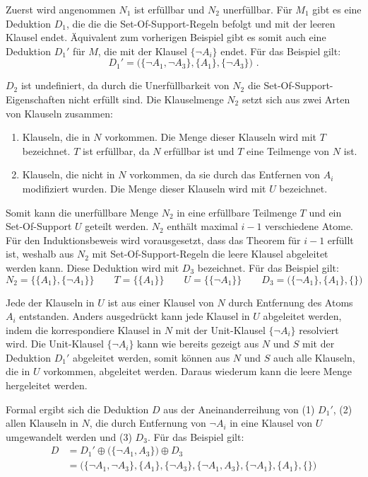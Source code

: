 Zuerst wird angenommen $N_1$ ist erfüllbar und $N_2$ unerfüllbar. Für $M_1$ gibt es eine Deduktion $D_1$, die die die Set-Of-Support-Regeln befolgt und mit der leeren Klausel endet. Äquivalent zum vorherigen Beispiel gibt es somit auch eine Deduktion $D_1'$ für $M$, die mit der Klausel $\{\neg A_i\}$ endet. Für das Beispiel gilt:
 $$D_1'=\big(\{\neg A_1, \neg A_3\},\{A_1\}, \{\neg A_3\}\big) \text{ .}$$
 
 $D_2$ ist undefiniert, da durch die Unerfüllbarkeit von $N_2$ die Set-Of-Support-Eigenschaften nicht erfüllt sind. Die Klauselmenge $N_2$ setzt sich aus zwei Arten von Klauseln zusammen:
 \begin{enumerate}
 	\item Klauseln, die in $N$ vorkommen. Die Menge dieser Klauseln wird mit $T$ bezeichnet. $T$ ist erfüllbar, da $N$ erfüllbar ist und $T$ eine Teilmenge von $N$ ist.
 	\item Klauseln, die nicht in $N$ vorkommen, da sie durch das Entfernen von $A_i$ modifiziert wurden. Die Menge dieser Klauseln wird mit $U$ bezeichnet.
 \end{enumerate}
 Somit kann die unerfüllbare Menge $N_2$ in eine erfüllbare Teilmenge $T$ und ein Set-Of-Support $U$ geteilt werden. $N_2$ enthält maximal $i-1$ verschiedene Atome. Für den Induktionsbeweis wird vorausgesetzt, dass das Theorem für $i-1$ erfüllt ist, weshalb aus $N_2$ mit Set-Of-Support-Regeln die leere Klausel abgeleitet werden kann. Diese Deduktion wird mit $D_3$ bezeichnet. Für das Beispiel gilt:
 $$N_2=\big\{\{A_1\},\{\neg A_1\}\big\} \quad\quad T=\big\{\{A_1\}\big\} \quad\quad U=\big\{\{\neg A_1\}\big\} \quad\quad D_3=\big(\{\neg A_1\},\{A_1\},\{\}\big)$$
 
 Jede der Klauseln in $U$ ist aus einer Klausel von $N$ durch Entfernung des Atoms $A_i$ entstanden. Anders ausgedrückt kann jede Klausel in $U$ abgeleitet werden, indem die korrespondiere Klausel in $N$ mit der Unit-Klausel $\{\neg A_i\}$ resolviert wird. Die Unit-Klausel $\{\neg A_i\}$ kann wie bereits gezeigt aus $N$ und $S$ mit der Deduktion $D_1'$ abgeleitet werden, somit können aus $N$ und $S$ auch alle Klauseln, die in $U$ vorkommen, abgeleitet werden. Daraus wiederum kann die leere Menge hergeleitet werden.
 
 Formal ergibt sich die Deduktion $D$ aus der Aneinanderreihung von (1) $D_1'$, (2) allen Klauseln in $N$, die durch Entfernung von $\neg A_i$ in eine Klausel von $U$ umgewandelt werden und (3) $D_3$. Für das Beispiel gilt:
 \begin{align*}
 	D &=D_1'\oplus\big(\{\neg A_1,A_3\}\big)\oplus D_3 \\
 	&= \big(\{\neg A_1, \neg A_3\}, \{A_1\}, \{\neg A_3\}, \{\neg A_1,A_3\}, \{\neg A_1\},\{A_1\},\{\} \big)
 \end{align*}

